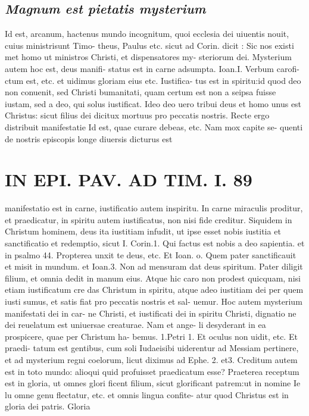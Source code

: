 \documentclass{article}
\begin{document}
\begin{pages}
\subsection*{\textit{Magnum est pietatis mysterium }}\pstart Id est, arcanum, hactenus mundo incognitum, quoi ecclesia dei uiuentis nouit, cuius ministrisunt Timo- theus, Paulus etc. sicut ad Corin. dicit : Sic nos existi met homo ut ministros Christi, et dispensatores my- steriorum dei. Mysterium autem hoc est, deus manifi- status est in carne adsumpta. Ioan.I. Verbum carofi- ctum est, etc. et uidimus gloriam eius etc. Iustifica- tus est in spiritu:id quod deo non conuenit, sed Christi bumanitati, quam certum est non a seipsa fuisse iustam, sed a deo, qui solus iustificat. Ideo deo uero tribui deus et homo unus est Christus: sicut filius dei dicitux mortuus pro peccatis nostris. Recte ergo distribuit manifestatie  \pend\pstart Id est, quae curare debeas, etc. Nam mox capite se- quenti de nostris episcopis longe diuersis dicturus est  \pend
\section*{IN EPI. PAV. AD TIM. I. 89 }
\marginpar{[ p.89 ]}\pstart manifestatio est in carne, iustificatio autem inspiritu. In carne miraculis proditur, et praedicatur, in spiritu autem iustificatus, non nisi fide creditur. Siquidem in Christum hominem, deus ita iustitiam infudit, ut ipse esset nobis iustitia et sanctificatio et redemptio, sicut I. Corin.1. Qui factus est nobis a deo sapientia. et in psalmo 44. Propterea unxit te deus, etc. Et Ioan. o. Quem pater sanctificauit et misit in mundum. et Ioan.3. Non ad mensuram dat deus spiritum. Pater diligit filium, et omnia dedit in manum eius. Atque hic caro non prodest quicquam, nisi etiam iustificatum cre das Christum in spiritu, atque adeo iustitiam dei per quem iusti sumus, et satis fiat pro peccatis nostris et sal- uemur. Hoc autem mysterium manifestati dei in car- ne Christi, et iustificati dei in spiritu Christi, dignatio ne dei reuelatum est uniuersae creaturae. Nam et ange- li desyderant in ea prospicere, quae per Christum ha- bemus. 1.Petri 1. Et oculus non uidit, etc. Et praedi- tatum est gentibus, cum soli Iudaeisibi uiderentur ad Messiam pertinere, et ad mysterium regni coelorum, licut diximus ad Ephe. 2. et3. Creditum autem est in toto mundo: alioqui quid profuisset praedicatum esse? Praeterea receptum est in gloria, ut omnes glori ficent filium, sicut glorificant patrem:ut in nomine Ie lu omne genu flectatur, etc. et omnis lingua confite- atur quod Christus est in gloria dei patris. Gloria  \pend

\end{pages}
\end{document}
